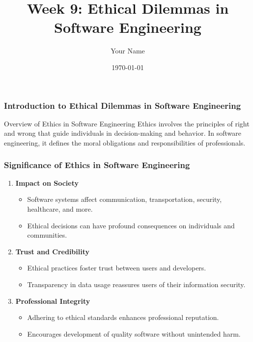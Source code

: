 \documentclass{beamer}
\title{Week 9: Ethical Dilemmas in Software Engineering}
\author{Your Name}
\institute{Your Institution}
\date{\today}
\begin{document}
\frame{\titlepage}

\begin{frame}[fragile]
    \frametitle{Introduction to Ethical Dilemmas in Software Engineering}
    \begin{block}{Overview of Ethics in Software Engineering}
        Ethics involves the principles of right and wrong that guide individuals in decision-making and behavior. In software engineering, it defines the moral obligations and responsibilities of professionals.
    \end{block}
\end{frame}

\begin{frame}[fragile]
    \frametitle{Significance of Ethics in Software Engineering}
    \begin{enumerate}
        \item \textbf{Impact on Society}
        \begin{itemize}
            \item Software systems affect communication, transportation, security, healthcare, and more.
            \item Ethical decisions can have profound consequences on individuals and communities.
        \end{itemize}
        
        \item \textbf{Trust and Credibility}
        \begin{itemize}
            \item Ethical practices foster trust between users and developers.
            \item Transparency in data usage reassures users of their information security.
        \end{itemize}
        
        \item \textbf{Professional Integrity}
        \begin{itemize}
            \item Adhering to ethical standards enhances professional reputation.
            \item Encourages development of quality software without unintended harm.
        \end{itemize}
    \end{enumerate}
\end{frame}
\end{document}
